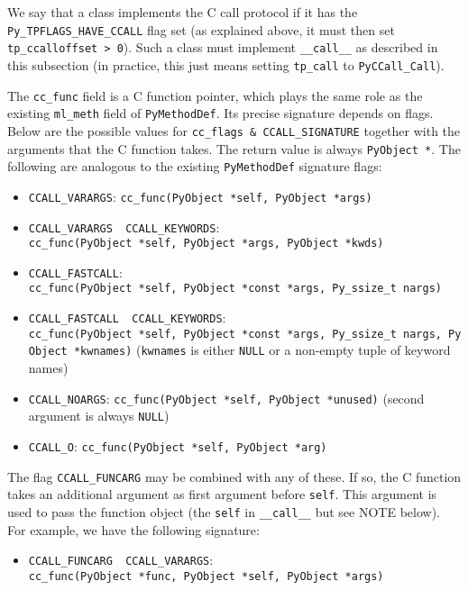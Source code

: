 We say that a class implements the C call protocol if it has the
\texttt{Py\_TPFLAGS\_HAVE\_CCALL} flag set (as explained above, it must
then set \texttt{tp\_ccalloffset\ \textgreater{}\ 0}). Such a class must
implement \texttt{\_\_call\_\_} as described in this subsection (in
practice, this just means setting \texttt{tp\_call} to
\texttt{PyCCall\_Call}).

The \texttt{cc\_func} field is a C function pointer, which plays the
same role as the existing \texttt{ml\_meth} field of
\texttt{PyMethodDef}. Its precise signature depends on flags. Below are
the possible values for \texttt{cc\_flags\ \&\ CCALL\_SIGNATURE}
together with the arguments that the C function takes. The return value
is always \texttt{PyObject\ *}. The following are analogous to the
existing \texttt{PyMethodDef} signature flags:

\begin{itemize}
\tightlist
\item
  \texttt{CCALL\_VARARGS}:
  \texttt{cc\_func(PyObject\ *self,\ PyObject\ *args)}
\item
  \texttt{CCALL\_VARARGS\ \textbar{}\ CCALL\_KEYWORDS}:
  \texttt{cc\_func(PyObject\ *self,\ PyObject\ *args,\ PyObject\ *kwds)}
\item
  \texttt{CCALL\_FASTCALL}:
  \texttt{cc\_func(PyObject\ *self,\ PyObject\ *const\ *args,\ Py\_ssize\_t\ nargs)}
\item
  \texttt{CCALL\_FASTCALL\ \textbar{}\ CCALL\_KEYWORDS}:
  \texttt{cc\_func(PyObject\ *self,\ PyObject\ *const\ *args,\ Py\_ssize\_t\ nargs,\ PyObject\ *kwnames)}
  (\texttt{kwnames} is either \texttt{NULL} or a non-empty tuple of
  keyword names)
\item
  \texttt{CCALL\_NOARGS}:
  \texttt{cc\_func(PyObject\ *self,\ PyObject\ *unused)} (second
  argument is always \texttt{NULL})
\item
  \texttt{CCALL\_O}: \texttt{cc\_func(PyObject\ *self,\ PyObject\ *arg)}
\end{itemize}

The flag \texttt{CCALL\_FUNCARG} may be combined with any of these. If
so, the C function takes an additional argument as first argument before
\texttt{self}. This argument is used to pass the function object (the
\texttt{self} in \texttt{\_\_call\_\_} but see NOTE below). For example,
we have the following signature:

\begin{itemize}
\tightlist
\item
  \texttt{CCALL\_FUNCARG\ \textbar{}\ CCALL\_VARARGS}:
  \texttt{cc\_func(PyObject\ *func,\ PyObject\ *self,\ PyObject\ *args)}
\end{itemize}

